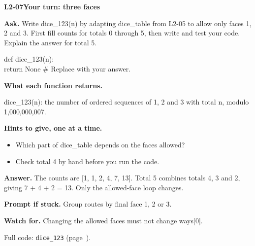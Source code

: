 \documentclass[11pt,a4paper]{article}
\begin{document}
\noindent\begin{minipage}{\textwidth}
{\color{teal}\textbf{L2-07}}\quad \textbf{Your turn: three faces}\par\smallskip
\textbf{Ask.} Write dice\_123(n) by adapting dice\_table from L2-05 to allow only faces 1, 2 and 3. First fill counts for totals 0 through 5, then write and test your code. Explain the answer for total 5.\par\smallskip
\par{}\par\smallskip\noindent\colorbox{codepaper}{\parbox{\dimexpr\linewidth-2\fboxsep\relax}{\small\ttfamily\raggedright def dice\_123(n):\\\hspace*{2.4em}return None  \# Replace with your answer.}}\par
{\small\textbf{What each function returns.}\par dice\_123(n): the number of ordered sequences of 1, 2 and 3 with total n, modulo 1,000,000,007.\par }
{\small\textbf{Hints to give, one at a time.}}\begin{itemize}\item Which part of dice\_table depends on the faces allowed?\item Check total 4 by hand before you run the code.\end{itemize}
\textbf{Answer.} The counts are [1, 1, 2, 4, 7, 13]. Total 5 combines totals 4, 3 and 2, giving 7 + 4 + 2 = 13. Only the allowed-face loop changes.\par\smallskip
\textbf{Prompt if stuck.} Group routes by final face 1, 2 or 3.\par\smallskip
\textbf{Watch for.} Changing the allowed faces must not change ways[0].\par\smallskip Full code: \texttt{dice\_123} (page~\pageref{L2-code-dice_123}).
\end{minipage}\par{}\medskip
\end{document}

